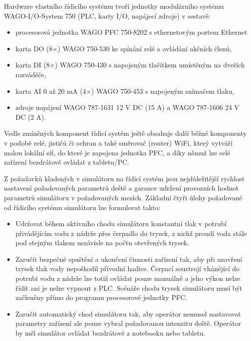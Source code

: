 Hardware vlastního řídicího systému tvoří jednotky modulárního systému WAGO-I/O-System 750 (PLC, karty I/O, napájecí zdroje) v sestavě:
\begin{itemize}
\item{procesorová jednotka WAGO PFC 750-8202 s ethernetovým portem Ethernet}
\item{karta DO (8×) WAGO 750-530 ke spínání relé a ovládání akčních členů,}
\item{karta DI (8×) WAGO 750-430 s napojeným tlačítkem umístěným na dveřích rozváděče,}
\item{karta AI 0 až 20 mA (4×) WAGO 750-453 s napojeným snímačem tlaku,}
\item{zdroje napájení WAGO 787-1631 12 V DC (15 A) a WAGO 787-1606 24 V DC (2 A).}
\end{itemize}
 
Vedle zmíněných komponent řídicí systém ještě obsahuje další běžné komponenty v podobě relé, jističů či ochran a také směrovač (router) WiFi, který vytváří malou lokální síť, do které je zapojena jednotka PFC, a díky němuž lze celé zařízení bezdrátově ovládat z tabletu/PC.
 
Z požadavků kladených v simulátoru na řídicí systém jsou nejdůležitější rychlost nastavení požadovaných parametrů deště a garance udržení provozních hodnot parametrů simulátoru v požadovaných mezích. Základní čtyři úlohy požadované od řídicího systému simulátoru lze formulovat takto:
\begin{itemize}
\item{Udržovat během aktivního chodu simulátoru konstantní tlak v potrubí přivádějícím vodu z nádrže přes čerpadlo do trysek, z nichž proudí voda stále pod stejným tlakem nezávisle na počtu otevřených trysek}.
\item{Zaručit bezpečné spuštění a ukončení činnosti zařízení tak, aby při uzavření trysek tlak vody nepoškodil přívodní hadice. Čerpací soustrojí vhánějící do potrubí vodu z nádrže lze totiž ovládat pouze manuálně a jeho výkon nelze řídit ani je nelze vypnout z PLC.
Scénáře chodu trysek simulátoru musí být začleněny přímo do programu procesorové jednotky PFC.}
\item{Zaručit automatický chod simulátoru tak, aby operátor nemusel nastavovat parametry zařízení ale pouze vybral požadovanou intenzitu deště. Operátor by měl simulátor ovládat bezdrátově z notebooku nebo tabletu.}
\end{itemize}

